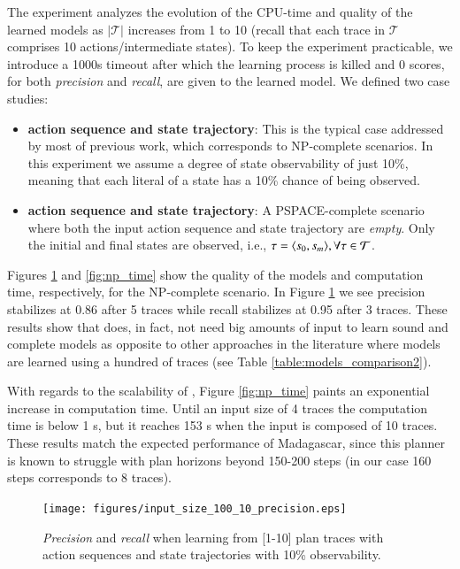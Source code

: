 The experiment analyzes the evolution of the CPU-time and quality of the learned models as $|\mathcal{T}|$ increases from 1 to 10 (recall that each trace in $\mathcal{T}$ comprises 10 actions/intermediate states). To keep the experiment practicable, we introduce a 1000s timeout after which the learning process is killed and $0$ scores, for both {\em precision} and {\em recall}, are given to the learned model. We defined two case studies:
\begin{itemize}
	\item \textbf{\FO action sequence and \PO state trajectory}: This is the typical case addressed by most of previous work, which corresponds to NP-complete scenarios. In this experiment we assume a degree of state observability of just 10\%, meaning that each literal of a state has a 10\% chance of being observed.
	\item  \textbf{\NO action sequence and \NO state trajectory}: A PSPACE-complete scenario where both the input action sequence and state trajectory are {\em empty}. Only the initial and final states are observed, i.e., $\tau = {\langle s_0, s_m \rangle}, \forall \tau \in \mathcal{T}$.
\end{itemize}

Figures \ref{fig:np_quality} and \ref{fig:np_time} show the quality of the models and computation time, respectively, for the NP-complete scenario. In Figure \ref{fig:np_quality} we see precision stabilizes at 0.86 after 5 traces while recall stabilizes at 0.95 after 3 traces. These results show that \FAMA does, in fact, not need big amounts of input to learn sound and complete models as opposite to other approaches in the literature where models are learned using a hundred of traces (see Table \ref{table:models_comparison2}).

With regards to the scalability of \FAMA, Figure \ref{fig:np_time} paints an exponential increase in computation time. Until an input size of 4 traces the computation time is below 1 s, but it reaches 153 s when the input is composed of 10 traces. These results match the expected performance of {\sc Madagascar}, since this planner is known to struggle with plan horizons beyond 150-200 steps (in our case 160 steps corresponds to 8 traces).

\begin{figure}[hbt!]
	\centering
	\texttt{[image: figures/input\_size\_100\_10\_precision.eps]}
	\caption{{\em Precision} and {\em recall} when learning from [1-10] plan traces with \FO action sequences and \PO state trajectories with 10\% observability.}
	\label{fig:np_quality}
\end{figure}

